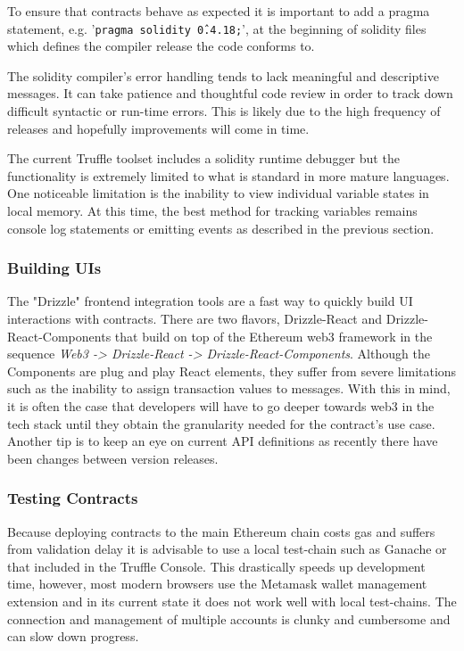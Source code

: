 To ensure that contracts behave as expected it is important to add a pragma statement, e.g. '\texttt{pragma solidity \^0.4.18;}', at the
beginning of solidity files which defines the compiler release the code conforms to.

The solidity compiler's error handling tends to lack meaningful and descriptive messages. It can
take patience and thoughtful code review in order to track down difficult syntactic or run-time
errors. This is likely due to the high frequency of releases and hopefully improvements will come
in time.

The current Truffle toolset includes a solidity runtime debugger but the functionality is extremely
limited to what is standard in more mature languages. One noticeable limitation is the
inability to view individual variable states in local memory. At this time, the best method
for tracking variables remains console log statements or emitting events as described in the
previous section.

\subsubsection{Building UIs}The "Drizzle" frontend integration tools are a fast way to quickly build UI interactions with
contracts. There are two flavors, Drizzle-React and Drizzle-React-Components that build on top
of the Ethereum web3 framework in the sequence \emph{Web3 -> Drizzle-React -> Drizzle-React-Components}.
Although the Components are plug and play React elements, they suffer from severe limitations such as the
inability to assign transaction values to messages. With this in mind, it is often the case that
developers will have to go deeper towards web3 in the tech stack until they obtain the
granularity needed for the contract's use case. Another tip is to keep an eye on current
API definitions as recently there have been changes between version releases.

\subsubsection{Testing Contracts}Because deploying contracts to the main Ethereum chain costs gas and suffers from validation delay
it is advisable to use a local test-chain such as Ganache or that included in the Truffle Console.
This drastically speeds up development time, however, most modern browsers use the Metamask wallet
management extension and in its current state it does not work well with local test-chains. The connection
and management of multiple accounts is clunky and cumbersome and can slow down progress.\\[0.2em]


